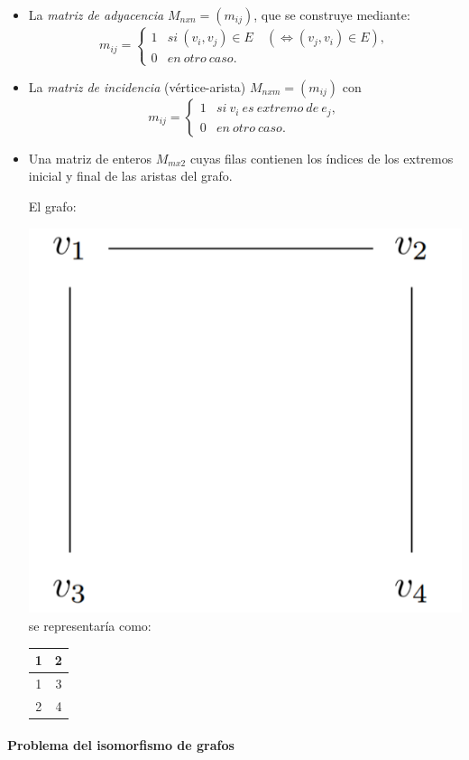 \begin{itemize}
	\item  La \textit{matriz de adyacencia} $M_{nxn} = (m_{ij})$, que se construye mediante:
	\[
		m_{ij} =
		\begin{cases}
		1 & si\ (v_i,v_j) \in E \quad ( \Leftrightarrow (v_j,v_i)\in E ), \\
		0 & en\ otro\ caso.
		\end{cases}
	\]
	
	\item La \textit{matriz de incidencia} (vértice-arista) $M_{nxm} = (m_{ij})$ con
	\[
	m_{ij} =
	\begin{cases}
	1 & si\ v_i\ es\ extremo\ de\ e_j, \\
	0 & en\ otro\ caso.
	\end{cases}
	\]
	
	\item Una matriz de enteros $M_{mx2}$ cuyas filas contienen los índices de los extremos inicial y final de las aristas del grafo.
	
	\begin{example}
		El grafo:
		
		\includegraphics[width=.2\linewidth]{gfx/exgraph}
		\qquad se representaría como: \qquad
		\begin{tabular}{|c|c|}
			\hline	1 & 2 \\ \hline 1 & 3 \\ \hline 2 & 4 \\ \hline
		\end{tabular}	
	
	\end{example}
	
\end{itemize}


\hfil


\paragraph{Problema del isomorfismo de grafos}



